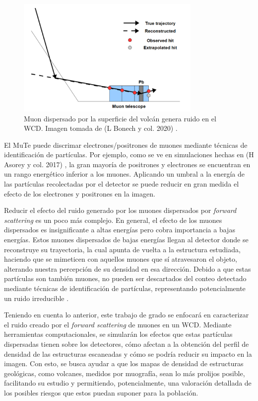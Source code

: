 \documentclass[12pt]{report}
\begin{document}
\begin{figure}
    \centering
    \includegraphics[width=3.5in]{images/scatteredNoiseV2.png}
    \caption{Muon dispersado por la superficie del volcán genera ruido en el WCD. Imagen tomada de (L Bonech y col. 2020) \cite{bonechi2020atmospheric}.}
    \label{fig:scatteredNoise}
\end{figure}

El MuTe puede discrimar electrones/positrones de muones mediante técnicas de identificación de partículas. Por ejemplo, como se ve en simulaciones hechas en (H Asorey y col. 2017) \cite{asorey2017muon}, la gran mayoría de positrones y electrones se encuentran en un rango energético inferior a los muones. Aplicando un umbral a la energía de las partículas recolectadas por el detector se puede reducir en gran medida el efecto de los electrones y positrones en la imagen.

Reducir el efecto del ruido generado por los muones dispersados por \textit{forward scattering} es un poco más complejo. En general, el efecto de los muones dispersados es insignificante a altas energías pero cobra importancia a bajas energías. Estos muones dispersados de bajas energías llegan al detector donde se reconstruye su trayectoria, la cual apunta de vuelta a la estructura estudiada, haciendo que se mimeticen con aquellos muones que sí atravesaron el objeto, alterando nuestra percepción de su densidad en esa dirección. Debido a que estas partículas son también muones, no pueden ser descartados del conteo detectado mediante técnicas de identificación de partículas, representando potencialmente un ruido irreducible \cite{gomez2017forward}.

Teniendo en cuenta lo anterior, este trabajo de grado se enfocará en caracterizar el ruido creado por el \textit{forward scattering} de muones en un WCD. Mediante herramientas computacionales, se simularán los efectos que estas partículas dispersadas tienen sobre los detectores, cómo afectan a la obtención del perfil de densidad de las estructuras escaneadas y cómo se podría reducir su impacto en la imagen. Con esto, se busca ayudar a que los mapas de densidad de estructuras geológicas, como volcanes, medidos por muografía, sean lo más prolijos posible, facilitando su estudio y permitiendo, potencialmente, una valoración detallada de los posibles riesgos que estos puedan suponer para la población.
\end{document}
